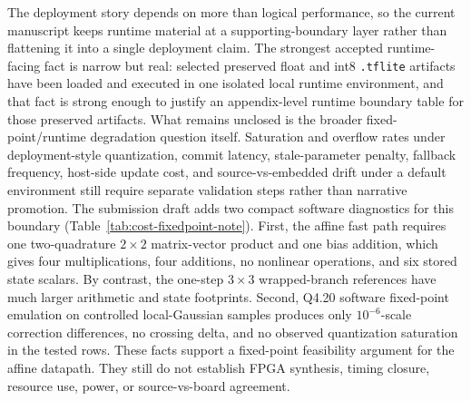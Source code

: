 \documentclass[11pt]{article}
\begin{document}
The deployment story depends on more than logical performance, so the current
manuscript keeps runtime material at a supporting-boundary layer rather than
flattening it into a single deployment claim.  The strongest accepted
runtime-facing fact is narrow but real: selected preserved float and int8
\texttt{.tflite} artifacts have been loaded and executed in one isolated
local runtime environment, and that fact is strong enough to justify an
appendix-level runtime boundary table for those preserved artifacts.  What
remains unclosed is the broader fixed-point/runtime degradation question
itself.  Saturation and overflow rates under deployment-style quantization,
commit latency, stale-parameter penalty, fallback frequency, host-side update
cost, and source-vs-embedded drift under a default environment still require
separate validation steps rather than narrative promotion.
The submission draft adds two compact software diagnostics for this boundary
(Table~\ref{tab:cost-fixedpoint-note}).  First, the affine fast path requires
one two-quadrature \(2\times2\) matrix-vector product and one bias addition,
which gives four multiplications, four additions, no nonlinear operations, and
six stored state scalars.  By contrast, the one-step \(3\times3\)
wrapped-branch references have much larger arithmetic and state footprints.
Second, Q4.20 software fixed-point emulation on controlled local-Gaussian
samples produces only \(10^{-6}\)-scale correction differences, no crossing
delta, and no observed quantization saturation in the tested rows.  These
facts support a fixed-point feasibility argument for the affine datapath.  They
still do not establish FPGA synthesis, timing closure, resource use, power, or
source-vs-board agreement.
\end{document}
